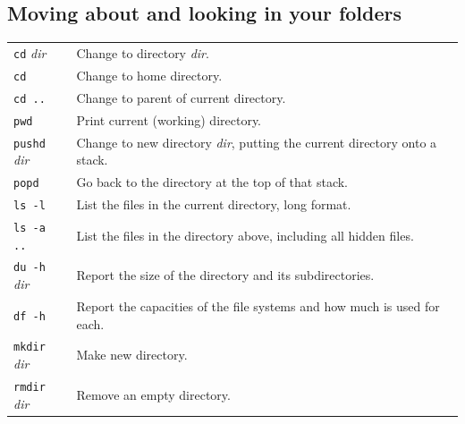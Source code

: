 \documentclass[12pt,a4paper,twoside]{article}
\begin{document}
\subsection*{Moving about and looking in your folders}
\begin{tabular}{l|l}
 \texttt{cd} \textit{dir} & Change to directory \textit{dir}. \\
 \texttt{cd} & Change to home directory. \\
 \texttt{cd ..} & Change to parent of current directory. \\
 \texttt{pwd} & Print current (working) directory. \\
 \texttt{pushd} \textit{dir} & \parbox{0.8\textwidth}{Change to new directory \textit{dir}, 
   putting the current directory onto a stack.} \\
 \texttt{popd} & Go back to the directory at the top of that stack. \\
 \texttt{ls -l} & List the files in the current directory, long format. \\
 \texttt{ls -a ..} & List the files in the directory above, including all hidden files. \\
 \texttt{du -h} \textit{dir} & Report the size of the directory and its subdirectories. \\
 \texttt{df -h} & Report the capacities of the file systems and how much is used for each. \\
 \texttt{mkdir} \textit{dir} & Make new directory. \\
 \texttt{rmdir} \textit{dir} & Remove an empty directory. \\
\end{tabular}
\end{document}
